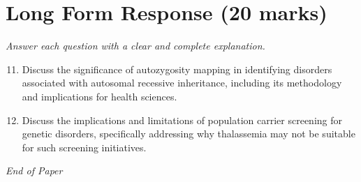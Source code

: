 \documentclass[12pt]{article}
\begin{document}
\section*{Long Form Response (20 marks)}
\textit{Answer each question with a clear and complete explanation.}
\begin{enumerate}[label=\arabic*.]
\setcounter{enumi}{10}
\item Discuss the significance of autozygosity mapping in identifying disorders associated with autosomal recessive inheritance, including its methodology and implications for health sciences.
\item Discuss the implications and limitations of population carrier screening for genetic disorders, specifically addressing why thalassemia may not be suitable for such screening initiatives.
\end{enumerate}

\vfill
\noindent\textit{End of Paper}
\end{document}
